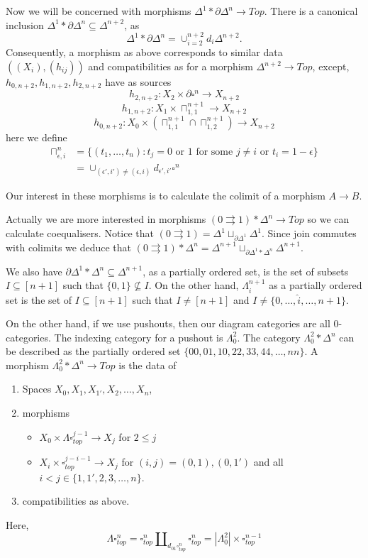 \documentclass[a4paper]{amsart}
\numberwithin{figure}{section}
\theoremstyle{theorem}
\theoremstyle{definition}
\begin{document}
Now we will be concerned with morphisms $\Delta^1 * \partial \Delta^n \to Top$. There is a canonical inclusion $\Delta^1 * \partial \Delta^n \subseteq \Delta^{n+2}$, as 
\[ \Delta^1 * \partial \Delta^n  = \cup_{i = 2}^{n+2} d_i \Delta^{n+2}. \]
Consequently, a morphism as above corresponds to similar data $((X_i), (h_{ij}))$ and compatibilities as for a morphism $\Delta^{n+2} \to Top$, except, $h_{0,n{+}2}, h_{1,n{+}2}, h_{2,n{+}2}$ have as sources
\[ h_{2,n{+}2}: X_2 \times \partial \square^n \to X_{n+2} \]
\[ h_{1,n{+}2}: X_1 \times \sqcap^{n+1}_{1,1} \to X_{n+2} \]
\[ h_{0,n{+}2}: X_0 \times (\sqcap^{n+1}_{1,1} \cap \sqcap^{n+1}_{1,2}) \to X_{n+2} \]
here we define
\begin{align*}
\sqcap^{n}_{\epsilon,i} &= \{ (t_1, \dots, t_n) : t_j = 0 \textrm{ or } 1 \textrm{ for some } j \neq i \textrm{ or } t_i = 1-\epsilon \}  \\
&= \cup_{(\epsilon', i') \neq (\epsilon, i)} d_{\epsilon',i'}\square^n 
\end{align*}

Our interest in these morphisms is to calculate the colimit of a morphism $A \to B$. 

Actually we are more interested in morphisms $(0 \rightrightarrows 1) * \Delta^n \to Top$ so we can calculate coequalisers. Notice that $(0\rightrightarrows 1) = \Delta^1 \sqcup_{\partial \Delta^1} \Delta^1$. Since join commutes with colimits we deduce that $(0 \rightrightarrows 1) * \Delta^n = \Delta^{n+1} \sqcup_{\partial \Delta^1 * \Delta^n} \Delta^{n+1}$.

We also have $\partial \Delta^1 * \Delta^n \subseteq \Delta^{n+1}$, as a partially ordered set, is the set of subsets $I \subseteq [n+1]$ such that $\{0, 1\} \not\subseteq I$. On the other hand, $\Lambda^{n+1}_i$ as a partially ordered set is the set of $I \subseteq [n+1]$ such that $I \neq [n+1]$ and $I \neq \{0, \dots, \hat{i}, \dots, n+1\}$. 

On the other hand, if we use pushouts, then our diagram categories are all 0-categories. The indexing category for a pushout is $\Lambda^2_0$. The category $\Lambda^2_0 * \Delta^n$ can be described as the partially ordered set $\{00, 01, 10, 22, 33, 44, \dots, nn \}$. A morphism $\Lambda^2_0 * \Delta^n \to Top$ is the data of 
\begin{enumerate}
 \item Spaces $X_0, X_1, X_{1'}, X_2, \dots, X_n$,
 \item morphisms 
 \begin{itemize}
  \item $X_0 \times \Lambda \!\!\square_{top}^{j-1} \to X_j$ for $2 \leq j$
 \item  $X_i \times \square_{top}^{j-i-1} \to X_j$ for $(i,j) = (0,1), (0,1')$ and all $i < j \in \{1, 1', 2, 3, \dots, n\}$.
 \end{itemize}
 \item compatibilities as above.
\end{enumerate}
Here, 
\[ \Lambda \!\!\square_{top}^{n} = \square_{top}^{n} \amalg_{d_{01}\square_{top}^{n}} \square_{top}^{n} = |\Lambda^2_0| \times \square_{top}^{n-1} \]
\end{document}
